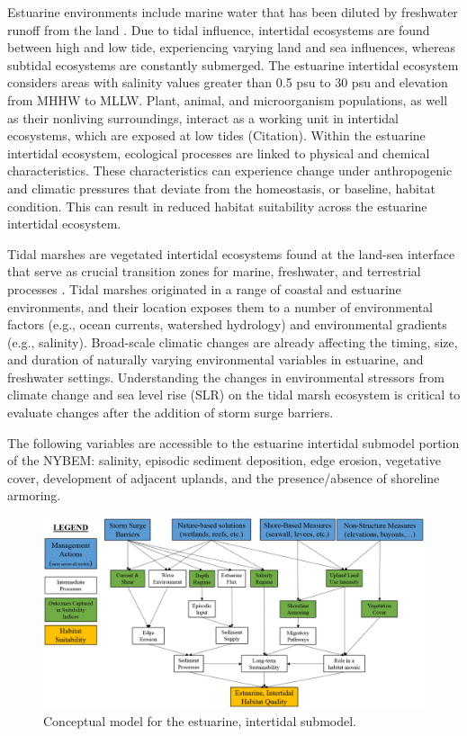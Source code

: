 \documentclass[
]{book}
\begin{document}
Estuarine environments include marine water that has been diluted by freshwater runoff from the land \citep{prosser_impacts_2018}. Due to tidal influence, intertidal ecosystems are found between high and low tide, experiencing varying land and sea influences, whereas subtidal ecosystems are constantly submerged. The estuarine intertidal ecosystem considers areas with salinity values greater than 0.5 psu to 30 psu and elevation from MHHW to MLLW. Plant, animal, and microorganism populations, as well as their nonliving surroundings, interact as a working unit in intertidal ecosystems, which are exposed at low tides (Citation). Within the estuarine intertidal ecosystem, ecological processes are linked to physical and chemical characteristics. These characteristics can experience change under anthropogenic and climatic pressures that deviate from the homeostasis, or baseline, habitat condition. This can result in reduced habitat suitability across the estuarine intertidal ecosystem.

Tidal marshes are vegetated intertidal ecosystems found at the land-sea interface that serve as crucial transition zones for marine, freshwater, and terrestrial processes \citep{colombano_climate_2021}. Tidal marshes originated in a range of coastal and estuarine environments, and their location exposes them to a number of environmental factors (e.g., ocean currents, watershed hydrology) and environmental gradients (e.g., salinity)\citep{lauchlan_species_2020}. Broad-scale climatic changes are already affecting the timing, size, and duration of naturally varying environmental variables in estuarine, and freshwater settings. Understanding the changes in environmental stressors from climate change and sea level rise (SLR) on the tidal marsh ecosystem is critical to evaluate changes after the addition of storm surge barriers.

The following variables are accessible to the estuarine intertidal submodel portion of the NYBEM: salinity, episodic sediment deposition, edge erosion, vegetative cover, development of adjacent uplands, and the presence/absence of shoreline armoring.

\begin{figure}
\includegraphics[width=23.04in]{ZZ_Fig04.04_Est.Int_ConModel} \caption{Conceptual model for the estuarine, intertidal submodel.}\label{fig:unnamed-chunk-12}
\end{figure}
\end{document}
